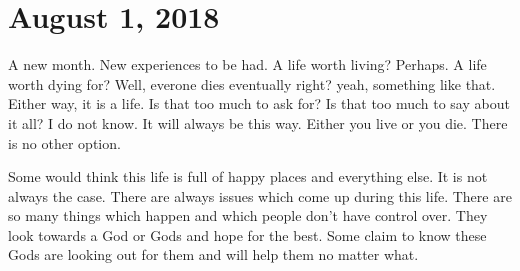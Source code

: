 \section{August 1, 2018}

A new month. New experiences to be had. A life worth living? Perhaps. A life worth
dying for? Well, everone dies eventually right? yeah, something like that. Either
way, it is a life. Is that too much to ask for? Is that too much to say about it all?
I do not know. It will always be this way. Either you live or you die. There is no
other option.

Some would think this life is full of happy places and everything else. It is not
always the case. There are always issues which come up during this life. There are so
many things which happen and which people don't have control over. They look towards
a God or Gods and hope for the best. Some claim to know these Gods are looking out
for them and will help them no matter what.